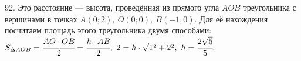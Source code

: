 92. Это расстояние --- высота, проведённая из прямого угла $AOB$ треугольника с вершинами в точках $A(0;2),\ O(0;0),\ B(-1;0).$ Для её нахождения посчитаем площадь этого треугольника двумя способами: $S_{\Delta AOB}=\cfrac{AO\cdot OB}{2}=\cfrac{h\cdot AB}{2},\ 2=h\cdot\sqrt{1^2+2^2},\ h=\cfrac{2\sqrt{5}}{5}.$\\
